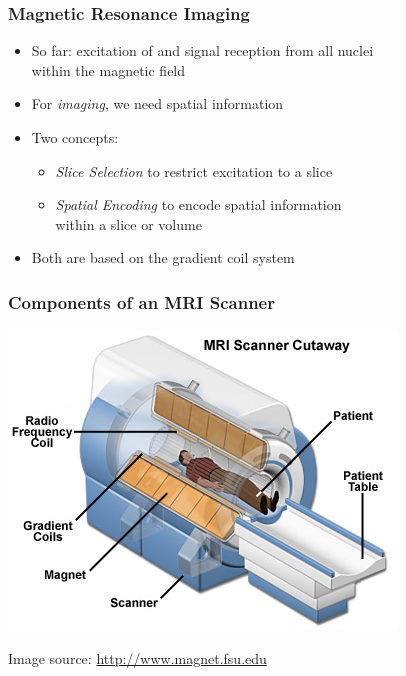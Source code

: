 \begin{frame}
	\frametitle{Magnetic Resonance {\color{red}Imaging}}
	
	\begin{itemize}
		\item So far: excitation of and signal reception from all \hydrogen{} nuclei \\ within the magnetic field
		\item For \emph{imaging}, we need spatial information
		\item Two concepts:
		\begin{itemize}
			\item \emph{Slice Selection} to restrict excitation to a slice
			\item \emph{Spatial Encoding} to encode spatial information \\ within a slice or volume
		\end{itemize}
		\item Both are based on the gradient coil system
	\end{itemize}
\end{frame}

\begin{frame}
	\frametitle{Components of an MRI Scanner}
	
	\begin{center}
		\includegraphics[height=0.8\textheight]{images/mri_scanner}
	\end{center}
	
	{\flushright
	\tiny Image source: \url{http://www.magnet.fsu.edu}}
\end{frame}

